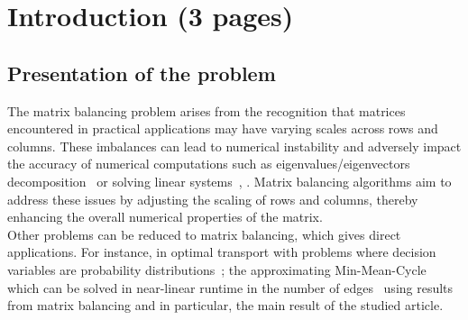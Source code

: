 \section{Introduction (3 pages)}

\cite{altschuler2023near}

\subsection{Presentation of the problem}

The matrix balancing problem arises from the recognition that matrices encountered in practical applications may have varying scales across rows and columns. These imbalances can lead to numerical instability and adversely impact the accuracy of numerical computations such as eigenvalues/eigenvectors decomposition~\cite{chen2000balancing, chen2001preconditioning} or solving linear systems~\cite{chen2001preconditioning}, . Matrix balancing algorithms aim to address these issues by adjusting the scaling of rows and columns, thereby enhancing the overall numerical properties of the matrix.\\

Other problems can be reduced to matrix balancing, which gives direct applications. For instance, in optimal transport with problems where decision variables are probability distributions~\cite{altschuler2022transport}; the approximating Min-Mean-Cycle which can be solved in near-linear runtime in the number of edges~\cite{altschuler2022approximating} using results from matrix balancing and in particular, the main result of the studied article. 



